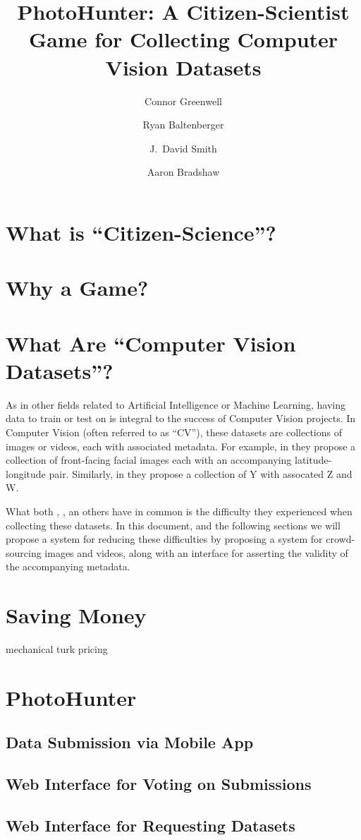 \documentclass{article}
\title{PhotoHunter: A Citizen-Scientist Game for Collecting Computer 
Vision Datasets}
\author{Connor Greenwell \and Ryan Baltenberger 
  \and J.\ David Smith \and Aaron Bradshaw}
\begin{document}
\maketitle

\section{What is ``Citizen-Science''?}

\section{Why a Game?}

\section{What Are ``Computer Vision Datasets''?}

As in other fields related to Artificial Intelligence or Machine
Learning, having data to train or test on is integral to the success
of Computer Vision projects. In Computer Vision (often referred to as 
``CV''), these datasets are collections of images or videos, each with
associated metadata. For example, in \cite{islam2014geofaces} they
propose a collection of front-facing facial images each with an
accompanying latitude-longitude pair. Similarly, in \cite{X} they
propose a collection of Y with assocated Z and W.

What both \cite{islam2014geofaces}, \cite{X}, an others have in common
is the difficulty they experienced when collecting these datasets. In
this document, and the following sections we will propose a system for
reducing these difficulties by proposing a system for crowd-sourcing
images and videos, along with an interface for asserting the validity
of the accompanying metadata.

\section{Saving Money}

mechanical turk pricing

\section{PhotoHunter}

\subsection{Data Submission via Mobile App}

\subsection{Web Interface for Voting on Submissions}

\subsection{Web Interface for Requesting Datasets}
\end{document}
